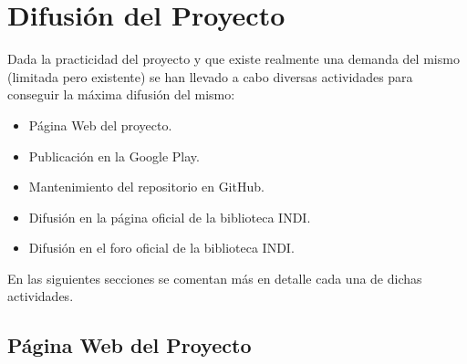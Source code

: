 \chapter{Difusión del Proyecto}

Dada la practicidad del proyecto y que existe realmente una demanda del mismo (limitada pero existente) se han llevado a cabo diversas actividades para conseguir la máxima difusión del mismo:

\begin{itemize}
  \item Página Web del proyecto.
  
  \item Publicación en la Google Play.
  
  \item Mantenimiento del repositorio en GitHub.
  
  \item Difusión en la página oficial de la biblioteca INDI.
  
  \item Difusión en el foro oficial de la biblioteca INDI.
\end{itemize}

En las siguientes secciones se comentan más en detalle cada una de dichas actividades.

\section{Página Web del Proyecto}

